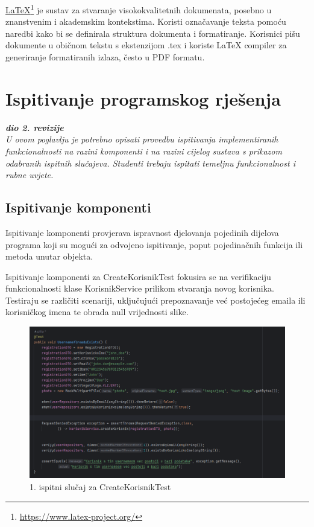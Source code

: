 \underline{LaTeX}\footnote{\url{https://www.latex-project.org/}} je sustav za stvaranje visokokvalitetnih dokumenata, posebno u znanstvenim i akademskim kontekstima. Koristi označavanje teksta pomoću naredbi kako bi se definirala struktura dokumenta i formatiranje. Korisnici pišu dokumente u običnom tekstu s ekstenzijom .tex i koriste LaTeX compiler za generiranje formatiranih izlaza, često u PDF formatu.


\eject 


\section{Ispitivanje programskog rješenja}

\textbf{\textit{dio 2. revizije}}\\

\textit{U ovom poglavlju je potrebno opisati provedbu ispitivanja implementiranih funkcionalnosti na razini komponenti i na razini cijelog sustava s prikazom odabranih ispitnih slučajeva. Studenti trebaju ispitati temeljnu funkcionalnost i rubne uvjete.}


\subsection{Ispitivanje komponenti}

Ispitivanje komponenti provjerava ispravnost djelovanja pojedinih dijelova programa koji su mogući za odvojeno ispitivanje, poput pojedinačnih funkcija ili metoda unutar objekta.

Ispitivanje komponenti za CreateKorisnikTest fokusira se na verifikaciju funkcionalnosti klase KorisnikService prilikom stvaranja novog korisnika. Testiraju se različiti scenariji, uključujući prepoznavanje već postojećeg emaila ili korisničkog imena te obrada null vrijednosti slike.

\begin{figure}[H]
	\includegraphics[width=\textwidth]{slike/username.png} %
	\centering
	\caption{1. ispitni slučaj za CreateKorisnikTest}
	\label{fig:dijagramstanja}
\end{figure}

